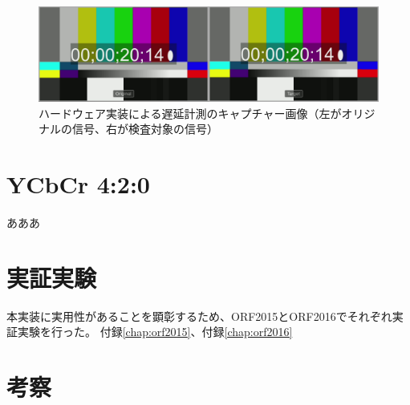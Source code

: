 \begin{figure}[htbp]
  \begin{center}
    \includegraphics[bb=0 0 1920 540,width=14cm]{img/evaluate-delay-hardware.png}
  \end{center}
  \caption[ハードウェア実装による遅延計測のキャプチャー画像]{ハードウェア実装による遅延計測のキャプチャー画像（左がオリジナルの信号、右が検査対象の信号）}
  \label{fig:evaluate-delay-hardware}
\end{figure}

\section{YCbCr 4:2:0}
あああ



\section{実証実験}
本実装に実用性があることを顕彰するため、ORF2015とORF2016でそれぞれ実証実験を行った。
付録\ref{chap:orf2015}、付録\ref{chap:orf2016}

\section{考察}
